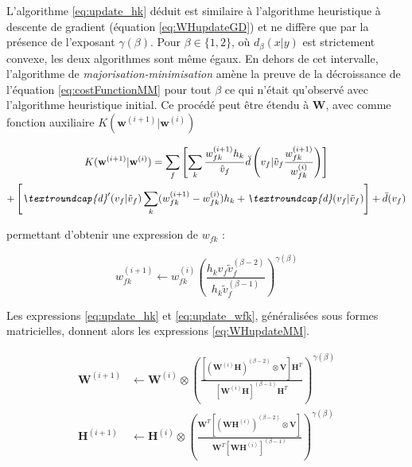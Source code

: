 L'algorithme \ref{eq:update_hk} déduit est similaire à l'algorithme heuristique à descente de gradient (équation \ref{eq:WHupdateGD}) et ne diffère que par la présence de l'exposant $\gamma
(\beta)$. Pour $\beta \in \lbrace 1, 2 \rbrace$, où $d_{\beta}(x\vert y)$ est strictement convexe, les deux algorithmes sont même égaux. En dehors de cet intervalle, l'algorithme de \textit{majorisation-minimisation} amène la preuve de la décroissance de l'équation \ref{eq:costFunctionMM} pour tout $\beta$ ce qui n'était qu'observé avec l'algorithme heuristique initial. Ce procédé peut être étendu à $\mathbf{W}$, avec comme fonction auxiliaire $K(\mathbf{w}^{(i+1)}\vert \mathbf{w}^{(i)})$

\begin{multline}\label{eq:derivé-fonc-auxiliaireK}
K(\mathbf{w}^{(i+1)}\vert \mathbf{w}^{(i)}) =\sum_f \left[ \sum_k \frac{w_{fk}^{(i+1)}h_{k}}{\tilde{v}_f} \breve{d}\left(v_f\vert \tilde{v}_f \frac{w_{fk}^{(i+1)}}{w_{fk}^{(i)}} \right) \right]\\+ \left[ \textit{\textroundcap{d}}'(v_f\vert \tilde{v}_f) \sum_k (w_{fk}^{(i+1)}-w_{fk}^{(i)}) h_k+ \textit{\textroundcap{d}}(v_f\vert \tilde{v}_f)\right] +\bar{d}(v_f)
\end{multline}

permettant d'obtenir une expression de $w_{fk}$ :

\begin{equation}\label{eq:update_wfk}
w_{fk}^{(i+1)} \leftarrow w_{fk}^{(i)}\left( \frac{h_k v_f \tilde{v}_f^{(\beta-2)}}{h_k\tilde{v}_{f}^{(\beta-1)}}\right)^{\gamma(\beta)}
\end{equation}

Les expressions \ref{eq:update_hk} et \ref{eq:update_wfk}, généralisées sous formes matricielles, donnent alors les expressions \ref{eq:WHupdateMM}.

\begin{subequations}\label{eq:WHupdateMM}
\begin{align}
\textbf{W}^{(i+1)} &\leftarrow \textbf{W}^{(i)}\otimes\left(\frac{\left[\left(\textbf{W}^{(i)}\mathbf{H} \right)^{(\beta-2)}\otimes\textbf{V} \right]\textbf{H}^T}{\left[\textbf{W}^{(i)}\mathbf{H} \right]^{(\beta-1)}\textbf{H}^T}\right)^{\gamma(\beta)}\label{eq:WupdateMM}\\
\textbf{H}^{(i+1)} &\leftarrow \textbf{H}^{(i)}\otimes\left(\frac{\textbf{W}^T \left[\left(\textbf{WH}^{(i)} \right)^{(\beta-2)}\otimes\textbf{V} \right]}{\textbf{W}^T \left[\textbf{WH}^{(i)} \right]^{(\beta-1)}}\right)^{\gamma(\beta)}\label{eq:HupdateMM}
\end{align}
\end{subequations}


